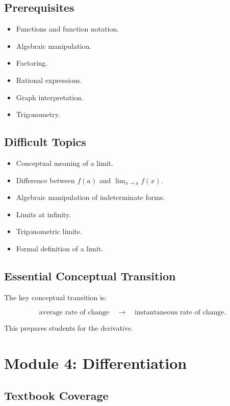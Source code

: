 \documentclass[11pt]{article}
\begin{document}
\subsection{Prerequisites}

\begin{itemize}
    \item Functions and function notation.
    \item Algebraic manipulation.
    \item Factoring.
    \item Rational expressions.
    \item Graph interpretation.
    \item Trigonometry.
\end{itemize}

\subsection{Difficult Topics}

\begin{itemize}
    \item Conceptual meaning of a limit.
    \item Difference between $f(a)$ and $\lim_{x\to a}f(x)$.
    \item Algebraic manipulation of indeterminate forms.
    \item Limits at infinity.
    \item Trigonometric limits.
    \item Formal definition of a limit.
\end{itemize}

\subsection{Essential Conceptual Transition}

The key conceptual transition is:

\[
\text{average rate of change}
\quad\longrightarrow\quad
\text{instantaneous rate of change}.
\]

This prepares students for the derivative.

\section{Module 4: Differentiation}

\subsection{Textbook Coverage}
\end{document}
